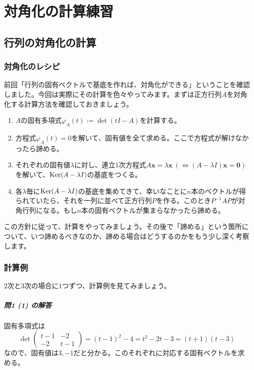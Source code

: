 \chapter{対角化の計算練習}

\section{行列の対角化の計算}

\subsection{対角化のレシピ}

前回「行列の固有ベクトルで基底を作れば、対角化ができる」ということを確認しました。今回は実際にその計算を色々やってみます。まずは正方行列$A$を対角化する計算方法を確認しておきましょう。

\begin{enumerate}
\item $A$の固有多項式$\varphi_A(t) := \det(tI - A)$を計算する。
\item 方程式$\varphi_A(t) = 0$を解いて、固有値を全て求める。ここで方程式が解けなかったら諦める。
\item それぞれの固有値$\lambda$に対し、連立$1$次方程式$A \bm{x} = \lambda\bm{x}\ (\Leftrightarrow (A - \lambda I)\bm{x} = \bm{0})$を解いて、$\operatorname{Ker} (A - \lambda I)$の基底をつくる。
\item 各$\lambda$毎に$\operatorname{Ker} (A - \lambda I)$の基底を集めてきて、幸いなことに$n$本のベクトルが得られていたら、それを一列に並べて正方行列$P$を作る。このとき$P^{-1} A P$が対角行列になる。もし$n$本の固有ベクトルが集まらなかったら諦める。
\end{enumerate}

この方針に従って、計算をやってみましょう。その後で「諦める」という箇所について、いつ諦めるべきなのか、諦める場合はどうするのかをもう少し深く考察します。

\subsection{計算例}

$2$次と$3$次の場合に$1$つずつ、計算例を見てみましょう。

\paragraph{問1 (1) の解答} 固有多項式は
\[
\det
\begin{pmatrix}
t - 1 & -2 \\
-2 & t - 1
\end{pmatrix}
= (t - 1)^2 - 4 = t^2 - 2t -3 = (t + 1)(t - 3)
\]
なので、固有値は$3, -1$だと分かる。このそれぞれに対応する固有ベクトルを求める。

